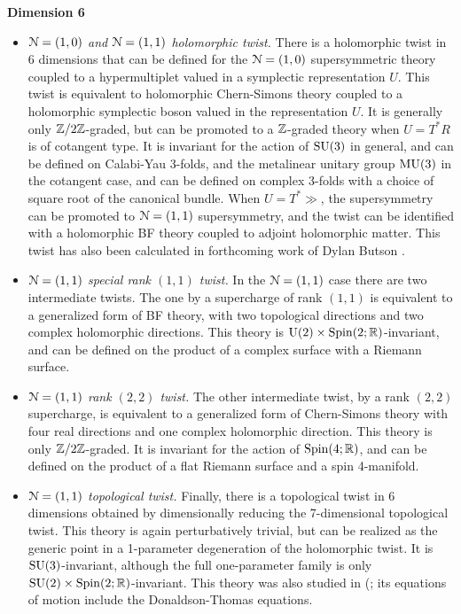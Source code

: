 \documentclass[10pt, oneside]{article}
\begin{document}
\textbf{Dimension 6}
\begin{itemize}
 \item \emph{$\mathcal{N}=(1,0)$ and $\mathcal{N}=(1,1)$ holomorphic twist.} There is a holomorphic twist in 6 dimensions that can be defined for the $\mathcal{N}=(1,0)$ supersymmetric theory coupled to a hypermultiplet valued in a symplectic representation $U$.  This twist is equivalent to holomorphic Chern-Simons theory coupled to a holomorphic symplectic boson valued in the representation $U$.  It is generally only $\mathbb Z/2\mathbb Z$-graded, but can be promoted to a $\mathbb Z$-graded theory when $U = T^*R$ is of cotangent type.  It is invariant for the action of $\mathrm{SU}(3)$ in general, and can be defined on Calabi-Yau 3-folds, and the metalinear unitary group $\mathrm{MU}(3)$ in the cotangent case, and can be defined on complex 3-folds with a choice of square root of the canonical bundle.  When $U = T^*\gg$, the supersymmetry can be promoted to $\mathcal{N}=(1,1)$ supersymmetry, and the twist can be identified with a holomorphic BF theory coupled to adjoint holomorphic matter.  This twist has also been calculated in forthcoming work of Dylan Butson \cite{Butson}. 
 \item \emph{$\mathcal{N}=(1,1)$ special rank $(1,1)$ twist.} In the $\mathcal{N}=(1,1)$ case there are two intermediate twists.  The one by a supercharge of rank $(1,1)$ is equivalent to a generalized form of BF theory, with two topological directions and two complex holomorphic directions.  This theory is $\mathrm{U}(2) \times \mathrm{Spin}(2;\mathbb R)$-invariant, and can be defined on the product of a complex surface with a Riemann surface.
 \item \emph{$\mathcal{N}=(1,1)$ rank $(2,2)$ twist.} The other intermediate twist, by a rank $(2,2)$ supercharge, is equivalent to a generalized form of Chern-Simons theory with four real directions and one complex holomorphic direction.  This theory is only $\mathbb Z/2\mathbb Z$-graded.  It is invariant for the action of $\mathrm{Spin}(4;\mathbb R)$, and can be defined on the product of a flat Riemann surface and a spin 4-manifold.
 \item \emph{$\mathcal{N}=(1,1)$ topological twist.} Finally, there is a topological twist in 6 dimensions obtained by dimensionally reducing the 7-dimensional topological twist.  This theory is again perturbatively trivial, but can be realized as the generic point in a 1-parameter degeneration of the holomorphic twist.  It is $\mathrm{SU}(3)$-invariant, although the full one-parameter family is only $\mathrm{SU}(2) \times \mathrm{Spin}(2;\mathbb R)$-invariant.  This theory was also studied in \cite{AcharyaOLoughlinSpence} (; its equations of motion include the Donaldson-Thomas equations.
\end{itemize}
\end{document}
